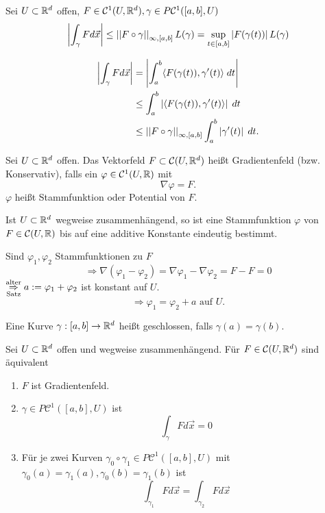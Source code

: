 \documentclass[../ana2.tex]{subfiles}
\begin{document}
\begin{lem}
    Sei \(U \subset \R^d\) offen, \(F \in \mathcal{C}^1(U, \R^d), \gamma \in P\mathcal{C}^1([a,b], U)\)
    \[ \abs{\int_\gamma F d\vec{x}} \leq \norm{F \circ \gamma}_{\infty,[a,b]} L(\gamma) 
    = \underset{t \in [a,b]}{\sup} \abs{F(\gamma(t))} L(\gamma)\]
\end{lem}
\begin{bew}
    \begin{align*}
        \abs{\int_\gamma F d\vec{x}} &= \abs{\integralx{\scalarprod{F(\gamma(t))}{\gamma'(t)}}{a}{b}{t}} \\
        &\leq \integralx{\abs{ \scalarprod{F(\gamma(t))}{\gamma'(t)}}}{a}{b}{t} \\
        &\leq \norm{F \circ \gamma}_{\infty, [a,b]} \integralx{\abs{\gamma'(t)}}{a}{b}{t}.
    \end{align*}
\end{bew}
\begin{defi}[Gradientenfeld]
    Sei \(U \subset \R^d\) offen. Das Vektorfeld \(F \subset \mathcal{C}(U,\R^d)\)
    heißt Gradientenfeld (bzw. Konservativ),
    falls ein \(\varphi \in \mathcal{C}^1(U, \R)\) mit 
    \[ \nabla \varphi = F. \] 
    \(\varphi\) heißt Stammfunktion oder Potential von \(F\).
\end{defi}
\begin{lem}
    Ist \( U \subset \R^d \) wegweise zusammenhängend, so 
    ist eine Stammfunktion \( \varphi \) von \( F \in \mathcal{C}(U, \R) \) 
    bis auf eine additive Konstante eindeutig bestimmt.
\end{lem}
\begin{bew}
    Sind \(\varphi_1, \varphi_2 \) Stammfunktionen zu \(F\)
    \[ \Rightarrow \nabla(\varphi_1-\varphi_2) = \nabla \varphi_1 - \nabla \varphi_2 
    = F-F = 0 \]
    \( \overundersett{alter}{Satz}{\Rightarrow} a := \varphi_1 + \varphi_2 \) ist 
    konstant auf \( U \). 
    \[ \Rightarrow \varphi_1 = \varphi_2 + a \text{ auf } U. \]
\end{bew}
\begin{defi}
    Eine Kurve \(\abb{\gamma}{[a,b]}{\R^d}\)
    heißt geschlossen, falls \(\gamma(a) = \gamma(b)\).
\end{defi}
\begin{satz}
    Sei \( U \subset \R^d\) offen und wegweise zusammenhängend.
    Für \( F \in \mathcal{C}(U, \R^d) \) sind äquivalent
    \begin{enumerate}
        \item \( F \) ist Gradientenfeld.
        \item \(\gamma \in P\mathcal{C}^1([a,b], U)\) ist 
        \[ \int_\gamma F d\vec{x} = 0 \]
        \item  Für je zwei Kurven \(\gamma_0 \circ \gamma_1 \in P\mathcal{C}^1([a,b],U)\)
        mit \(\gamma_0(a) = \gamma_1(a), \gamma_0(b) = \gamma_1(b)\) ist    
        \[ \int_{\gamma_1} F d\vec{x} = \int_{\gamma_2} F d\vec{x} \]
    \end{enumerate}
\end{satz}
\end{document}
